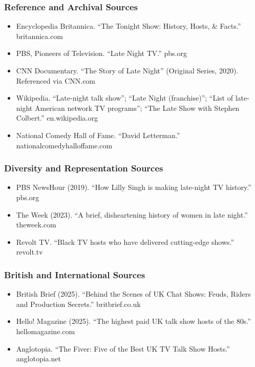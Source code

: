 \documentclass[11pt,letterpaper]{article}
\begin{document}
\subsubsection{Reference and Archival Sources}
\begin{itemize}[leftmargin=1.5em, itemsep=0.2em]
  \item Encyclopedia Britannica. ``The Tonight Show: History, Hosts, \& Facts.'' britannica.com
  \item PBS, Pioneers of Television. ``Late Night TV.'' pbs.org
  \item CNN Documentary. ``The Story of Late Night'' (Original Series, 2020). Referenced via CNN.com
  \item Wikipedia. ``Late-night talk show''; ``Late Night (franchise)''; ``List of late-night American network TV programs''; ``The Late Show with Stephen Colbert.'' en.wikipedia.org
  \item National Comedy Hall of Fame. ``David Letterman.'' nationalcomedyhalloffame.com
\end{itemize}

\subsubsection{Diversity and Representation Sources}
\begin{itemize}[leftmargin=1.5em, itemsep=0.2em]
  \item PBS NewsHour (2019). ``How Lilly Singh is making late-night TV history.'' pbs.org
  \item The Week (2023). ``A brief, disheartening history of women in late night.'' theweek.com
  \item Revolt TV. ``Black TV hosts who have delivered cutting-edge shows.'' revolt.tv
\end{itemize}

\subsubsection{British and International Sources}
\begin{itemize}[leftmargin=1.5em, itemsep=0.2em]
  \item British Brief (2025). ``Behind the Scenes of UK Chat Shows: Feuds, Riders and Production Secrets.'' britbrief.co.uk
  \item Hello! Magazine (2025). ``The highest paid UK talk show hosts of the 80s.'' hellomagazine.com
  \item Anglotopia. ``The Fiver: Five of the Best UK TV Talk Show Hosts.'' anglotopia.net
\end{itemize}
\end{document}
